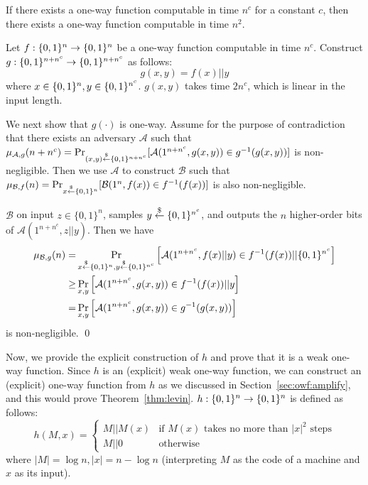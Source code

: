 \begin{lemma}\label{lem:n2owf}
If there exists a one-way function computable in time $n^c$ for a constant $c$, then there exists a one-way function computable in time $n^2$.
\end{lemma}
\proof
Let $f: \{0,1\}^{n} \rightarrow \{0,1\}^{n}$ be a one-way function computable in time $n^c$.
Construct $g: \{0,1\}^{n+n^c} \rightarrow \{0,1\}^{n+n^c}$ as follows:
$$g(x,y) = f(x) || y$$
where $x \in \{0,1\}^{n}, y \in \{0,1\}^{n^c}$.
$g(x,y)$ takes time $2n^c$, which is linear in the input length.

We next show that $g(\cdot)$ is one-way.
Assume for the purpose of contradiction that there exists an adversary $\mathcal{A}$ such that $\mu_{\mathcal{A},g}(n+n^c) = \Pr_{(x,y) \stackrel{\$}{\leftarrow} \{0,1\}^{n+n^c}}[ \mathcal{A}(1^{n+n^c}, g(x,y)) \in g^{-1}(g(x,y))]$ is non-negligible. Then we use $\mathcal{A}$ to construct $\mathcal{B}$ such that $\mu_{\mathcal{B},f}(n) = \Pr_{x \stackrel{\$}{\leftarrow} \{0,1\}^{n}}[ \mathcal{B}(1^n, f(x)) \in f^{-1}(f(x))]$ is also non-negligible.

$\mathcal{B}$ on input $z \in\{0,1\}^n$, samples $y \stackrel{\$}{\leftarrow} \{0,1\}^{n^c}$, and outputs the $n$ higher-order bits of  $\mathcal{A}(1^{n+n^c}, z||y)$. Then we have
\begin{align*}
\mu_{\mathcal{B},g}(n) =& \Pr_{x \stackrel{\$}{\leftarrow} \{0,1\}^{n}, y \stackrel{\$}{\leftarrow} \{0,1\}^{n^c}}\left[\mathcal{A}(1^{n+n^c}, f(x) || y) \in f^{-1}(f(x)) || \{0,1\}^{n^c}\right]\\
\geq&\Pr_{x,y}\left[\mathcal{A}(1^{n+n^c}, g(x,y)) \in f^{-1}(f(x)) || y\right]\\
=& \Pr_{x,y}\left[\mathcal{A}(1^{n+n^c}, g(x,y)) \in g^{-1}(g(x,y))\right]
\end{align*}
is non-negligible.
\qed

\bigskip
Now, we provide the explicit construction of $h$ and prove that it is a weak one-way function.
Since $h$ is an (explicit) weak one-way function, we can construct an (explicit) one-way function from $h$ as we discussed in Section~\ref{sec:owf:amplify}, and this would prove Theorem~\ref{thm:levin}.
$h: \{0,1\}^{n} \rightarrow \{0,1\}^{n}$ is defined as follows:
$$
h(M,x) = \left\{
\begin{array}{ll}
M || M(x) & \text{if $M(x)$ takes no more than $|x|^2$ steps} \\
M || 0 & \text{otherwise}
\end{array}
\right.
$$
where $|M| = \log n, |x| = n - \log n$ (interpreting $M$ as the code of a machine  and $x$ as its input).

